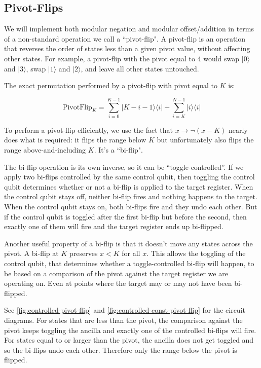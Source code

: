 \documentclass[twocolumn,longbibliography]{quantumarticle-customized}
\begin{document}
\subsection{Pivot-Flips} \label{sec:pivot-flips}

We will implement both modular negation and modular offset/addition in terms of a non-standard operation we call a ``pivot-flip".
A pivot-flip is an operation that reverses the order of states less than a given pivot value, without affecting other states.
For example, a pivot-flip with the pivot equal to 4 would swap $|0\rangle$ and $|3\rangle$, swap $|1\rangle$ and $|2\rangle$, and leave all other states untouched.

The exact permutation performed by a pivot-flip with pivot equal to $K$ is:

$$\text{PivotFlip}_K = \sum_{i=0}^{K-1} |K-i-1\rangle \langle i| + \sum_{i=K}^{N-1} |i\rangle \langle i|$$

To perform a pivot-flip efficiently, we use the fact that $x \rightarrow \lnot(x - K)$ nearly does what is required: it flips the range below $K$ but unfortunately also flips the range above-and-including $K$.
It's a ``bi-flip".

The bi-flip operation is its own inverse, so it can be ``toggle-controlled''.
If we apply two bi-flips controlled by the same control qubit, then toggling the control qubit determines whether or not a bi-flip is applied to the target register.
When the control qubit stays off, neither bi-flip fires and nothing happens to the target.
When the control qubit stays on, both bi-flips fire and they undo each other.
But if the control qubit is toggled after the first bi-flip but before the second, then exactly one of them will fire and the target register ends up bi-flipped.

Another useful property of a bi-flip is that it doesn't move any states across the pivot.
A bi-flip at $K$ preserves $x<K$ for all $x$.
This allows the toggling of the control qubit, that determines whether a toggle-controlled bi-flip will happen, to be based on a comparison of the pivot against the target register we are operating on.
Even at points where the target may or may not have been bi-flipped.

See \autoref{fig:controlled-pivot-flip} and \autoref{fig:controlled-const-pivot-flip} for the circuit diagrams.
For states that are less than the pivot, the comparison against the pivot keeps toggling the ancilla and exactly one of the controlled bi-flips will fire.
For states equal to or larger than the pivot, the ancilla does not get toggled and so the bi-flips undo each other.
Therefore only the range below the pivot is flipped.
\end{document}
